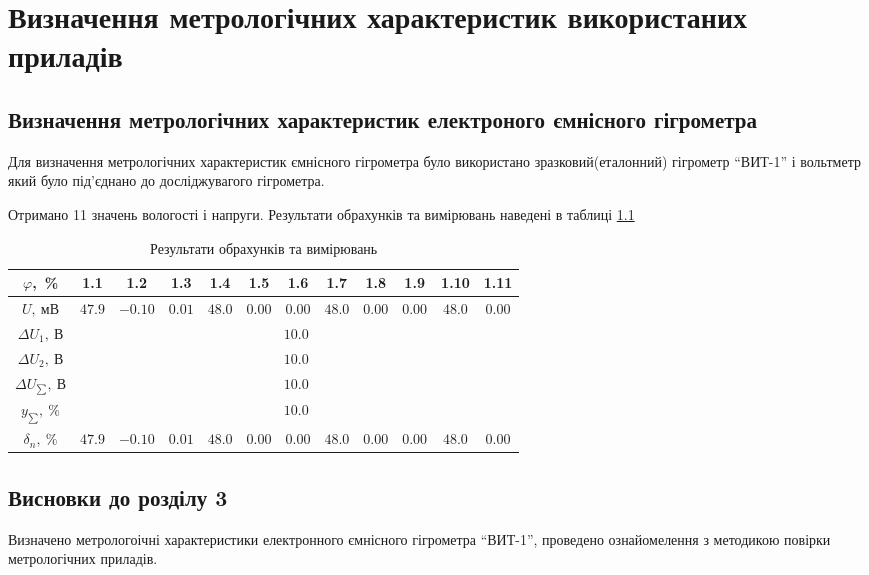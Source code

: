 \chapter{Визначення метрологічних характеристик використаних приладів}
\section{Визначення метрологічних характеристик електроного ємнісного гігрометра}

Для визначення метрологічних характеристик ємнісного гігрометра було використано
зразковий(еталонний) гігрометр ``ВИТ-1'' і вольтметр який було під’єднано до досліджувагого гігрометра.

Отримано 11 значень вологості і напруги. Результати обрахунків та вимірювань наведені в таблиці \ref{t:metrological_exp}

\begin{table}[ht!]
  \caption{Результати обрахунків та вимірювань}
  \label{t:metrological_exp}
\begin{tabular}{| c | c | c | c | c | c | c | c | c | c | c | c |}
\hline
\multicolumn{1}{|c|}{$\varphi$,~\%} &
\multicolumn{1}{c|}{1.1} &
\multicolumn{1}{c|}{1.2} &
\multicolumn{1}{c|}{1.3} &
\multicolumn{1}{c|}{1.4} &
\multicolumn{1}{c|}{1.5} &
\multicolumn{1}{c|}{1.6} &
\multicolumn{1}{c|}{1.7} &
\multicolumn{1}{c|}{1.8} &
\multicolumn{1}{c|}{1.9} &
\multicolumn{1}{c|}{1.10} &
\multicolumn{1}{c|}{1.11} \\ \hline
$U,~\text{мВ}$ & $47.9$ & $-0.10$ & $0.01$ & $48.0$ & $0.00$ & $0.00$ & $48.0$ & $0.00$ & $0.00$ & $48.0$ & $0.00$  \\ \hline 
$\Delta U_1,~\text{В}$ & \multicolumn{11}{|c|}{$10.0$}  \\ \hline
$\Delta U_2,~\text{В}$ & \multicolumn{11}{|c|}{$10.0$}  \\ \hline
$\Delta U_{\sum},~В $ & \multicolumn{11}{|c|}{$10.0$}  \\ \hline
$y_{\sum}, ~\% $ & \multicolumn{11}{|c|}{$10.0$}  \\ \hline
$\delta_n,~\%$ & $47.9$ & $-0.10$ & $0.01$ & $48.0$ & $0.00$ & $0.00$ & $48.0$ & $0.00$ & $0.00$ & $48.0$ & $0.00$  \\ \hline
\end{tabular}
\end{table}


\section*{Висновки до розділу 3}

Визначено метрологоічні характеристики електронного ємнісного гігрометра ``ВИТ-1'', проведено
ознайомелення з методикою повірки метрологічних приладів.
